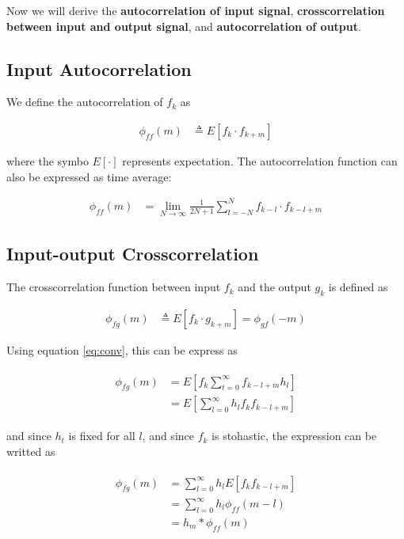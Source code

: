 \documentclass[8pt,a4paper]{article}
\begin{document}
\begin{multicols}{2}
Now we will derive the \textbf{autocorrelation of input signal}, \textbf{crosscorrelation between input and output signal}, and \textbf{ autocorrelation of output}. 

\subsection*{Input Autocorrelation}
We define the autocorrelation of $f_{k}$ as

\begin{align}
  \phi_{ff}(m) &\triangleq E \left[ f_{k} \cdot f_{k+m} \right]
\end{align}

where the symbo $E[\cdot]$ represents expectation. The autocorrelation function can also be expressed as time average:

\begin{align}
  \phi_{ff}(m) &= \lim_{N\rightarrow\infty} \frac{1}{2N+1} \sum_{l=-N}^{N} f_{k-l} \cdot f_{k-l+m}
\end{align}

\subsection*{Input-output Crosscorrelation}

The crosscorrelation function between input $f_{k}$ and the output $g_{k}$ is defined as


\begin{align}
  \phi_{fg}(m) &\triangleq E \left[ f_{k} \cdot g_{k+m} \right] = \phi_{gf}(-m)
\end{align}

Using equation \ref{eq:conv}, this can be express as

\begin{align}
  \begin{split}
    \phi_{fg}(m) &= E \left[ f_{k} \sum_{t=0}^{\infty} f_{k-l+m}h_{l} \right]\\
    &= E \left[ \sum_{l=0}^{\infty} h_{l} f_{k} f_{k-l+m} \right]
  \end{split}
\end{align}

and since $h_{t}$ is fixed for all $ l $, and since $f_{k}$ is stohastic, the expression can be writted as

\begin{align}
  \label{eq:input_output_crosscorrelation}
  \begin{split}
    \phi_{fg}(m) &= \sum_{l=0}^{\infty} h_{l} E \left[ f_{k} f_{k-l+m} \right] \\
    &= \sum_{l=0}^{\infty} h_{l} \phi_{ff}(m-l) \\
    &= h_{m} * \phi_{ff}(m)
  \end{split}
\end{align}


\end{multicols}
\end{document}

